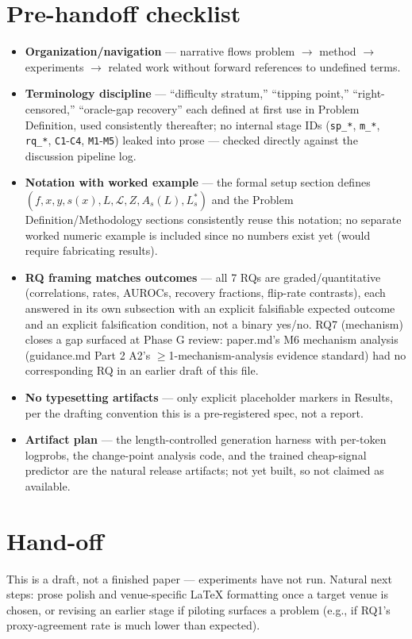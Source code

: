 \documentclass[11pt]{article}
\begin{document}
\section*{Pre-handoff checklist}
\begin{itemize}[leftmargin=1.4em]
\item \textbf{Organization/navigation} --- narrative flows problem $\to$ method $\to$ experiments $\to$ related work without forward references to undefined terms.
\item \textbf{Terminology discipline} --- ``difficulty stratum,'' ``tipping point,'' ``right-censored,'' ``oracle-gap recovery'' each defined at first use in Problem Definition, used consistently thereafter; no internal stage IDs (\texttt{sp\_*}, \texttt{m\_*}, \texttt{rq\_*}, \texttt{C1}-\texttt{C4}, \texttt{M1}-\texttt{M5}) leaked into prose --- checked directly against the discussion pipeline log.
\item \textbf{Notation with worked example} --- the formal setup section defines $(f, x, y, s(x), L, \mathcal{L}, Z, A_s(L), L^*_s)$ and the Problem Definition/Methodology sections consistently reuse this notation; no separate worked numeric example is included since no numbers exist yet (would require fabricating results).
\item \textbf{RQ framing matches outcomes} --- all 7 RQs are graded/quantitative (correlations, rates, AUROCs, recovery fractions, flip-rate contrasts), each answered in its own subsection with an explicit falsifiable expected outcome and an explicit falsification condition, not a binary yes/no. RQ7 (mechanism) closes a gap surfaced at Phase G review: paper.md's M6 mechanism analysis (guidance.md Part 2 A2's $\geq$1-mechanism-analysis evidence standard) had no corresponding RQ in an earlier draft of this file.
\item \textbf{No typesetting artifacts} --- only explicit placeholder markers in Results, per the drafting convention this is a pre-registered spec, not a report.
\item \textbf{Artifact plan} --- the length-controlled generation harness with per-token logprobs, the change-point analysis code, and the trained cheap-signal predictor are the natural release artifacts; not yet built, so not claimed as available.
\end{itemize}

\section*{Hand-off}
This is a draft, not a finished paper --- experiments have not run. Natural next steps: prose polish and venue-specific LaTeX formatting once a target venue is chosen, or revising an earlier stage if piloting surfaces a problem (e.g., if RQ1's proxy-agreement rate is much lower than expected).



\end{document}
